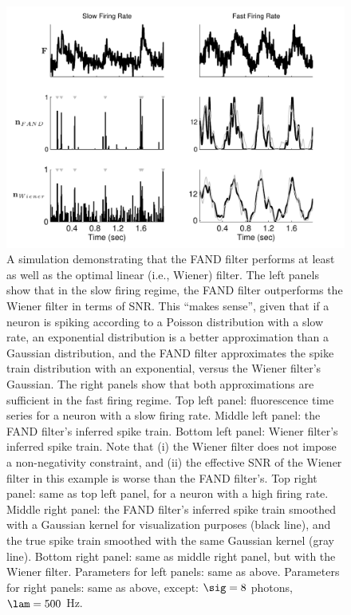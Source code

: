 \begin{figure}[H]
\centering \includegraphics[width=.9\linewidth]{../figs/example_sim}
\caption{A simulation demonstrating that the FAND filter performs at least as well as the optimal linear (i.e., Wiener) filter. The left panels show that in the slow firing regime, the FAND filter outperforms the Wiener filter in terms of SNR.  This ``makes sense'', given that if a neuron is spiking according to a Poisson distribution with a slow rate, an exponential distribution is a better approximation than a Gaussian distribution, and the FAND filter approximates the spike train distribution with an exponential, versus the Wiener filter's Gaussian. The right panels show that both approximations are sufficient in the fast firing regime. Top left panel: fluorescence time series for a neuron with a slow firing rate.  Middle left panel: the FAND filter's inferred spike train.  Bottom left panel: Wiener filter's inferred spike train.  Note that (i) the Wiener filter does not impose a non-negativity constraint, and (ii) the effective SNR of the Wiener filter in this example is worse than the FAND filter's.  Top right panel: same as top left panel, for a neuron with a high firing rate.  Middle right panel: the FAND filter's inferred spike train smoothed with a Gaussian kernel for visualization purposes (black line), and the true spike train smoothed with the same Gaussian kernel (gray line).  Bottom right panel: same as middle right panel, but with the Wiener filter. Parameters for left panels: same as above.  Parameters for right panels: same as above, except: $\sig=8$ photons, $\lam=500$ Hz.} \label{fig:wiener}
\end{figure}

